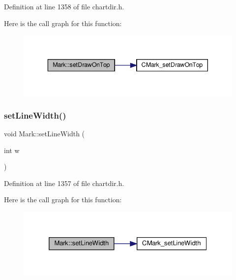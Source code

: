 Definition at line 1358 of file chartdir.\+h.

Here is the call graph for this function\+:
\nopagebreak
\begin{figure}[H]
\begin{center}
\leavevmode
\includegraphics[width=343pt]{class_mark_a2d599567c3fa6109d6d8c75625fb251b_cgraph}
\end{center}
\end{figure}
\mbox{\label{class_mark_a6a7b98154ccea45ca673e2ec658a28ad}} 
\subsubsection{\texorpdfstring{set\+Line\+Width()}{setLineWidth()}}
{\footnotesize\ttfamily void Mark\+::set\+Line\+Width (\begin{DoxyParamCaption}\item[{int}]{w }\end{DoxyParamCaption})\hspace{0.3cm}{\ttfamily [inline]}}



Definition at line 1357 of file chartdir.\+h.

Here is the call graph for this function\+:
\nopagebreak
\begin{figure}[H]
\begin{center}
\leavevmode
\includegraphics[width=325pt]{class_mark_a6a7b98154ccea45ca673e2ec658a28ad_cgraph}
\end{center}
\end{figure}
\mbox{\label{class_mark_a61c1d13aaab343847f90d929158e7b77}} 
